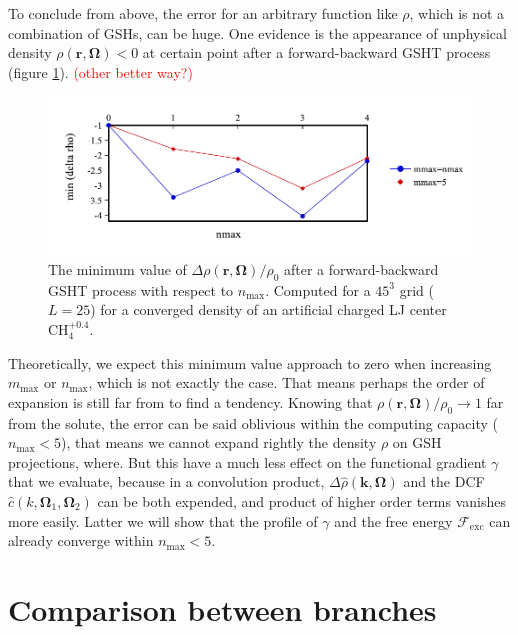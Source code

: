 To conclude from above, the error for an arbitrary function like $\rho$,
which is not a combination of \acs{GSH}s, can be huge. One evidence
is the appearance of unphysical density $\rho(\mathbf{r},\mathbf{\Omega})<0$
at certain point after a forward-backward \acs{GSHT} process (figure
\ref{fig:unphysical-rho}). \textcolor{red}{(other better way?)}

\begin{figure}[h]
\begin{centering}
\includegraphics[bb=0bp 10bp 454bp 160bp,width=0.75\columnwidth]{_figure/results/min_delta_rho}
\par\end{centering}
\caption[The minimum value of $\Delta\rho(\mathbf{r},\mathbf{\Omega})/\rho_{0}$
after a forward-backward \acs{GSHT} process]{The minimum value of $\Delta\rho(\mathbf{r},\mathbf{\Omega})/\rho_{0}$
after a forward-backward \acs{GSHT} process with respect to $n_{\max}$.
Computed for a $45^{3}$ grid ($L=25$) for a converged density of
an artificial charged LJ center $\mathrm{CH}_{4}^{+0.4}$. \label{fig:unphysical-rho} }
\end{figure}

Theoretically, we expect this minimum value approach to zero when
increasing $m_{\max}$ or $n_{\max}$, which is not exactly the case.
That means perhaps the order of expansion is still far from to find
a tendency. Knowing that $\rho(\mathbf{r},\mathbf{\Omega})/\rho_{0}\rightarrow1$
far from the solute, the error can be said oblivious within the computing
capacity ($n_{\max}<5$), that means we cannot expand rightly the
density $\rho$ on \acs{GSH} projections, where. But this have a
much less effect on the functional gradient $\gamma$ that we evaluate,
because in a convolution product, $\Delta\hat{\rho}(\mathbf{k},\mathbf{\Omega})$
and the \acs{DCF} $\hat{c}(k,\mathbf{\Omega}_{1},\mathbf{\Omega}_{2})$
can be both expended, and product of higher order terms vanishes more
easily. Latter we will show that the profile of $\gamma$ and the
free energy $\mathcal{F}_{\mathrm{exc}}$ can already converge within
$n_{\max}<5$.

\section{Comparison between branches}

